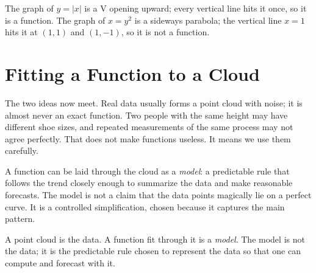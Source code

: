 \documentclass[12pt]{book}
\begin{document}
\begin{center}
\end{center}

\begin{example}
The graph of $y=|x|$ is a V opening upward; every vertical line hits it once, so it
is a function. The graph of $x=y^2$ is a sideways parabola; the vertical line
$x=1$ hits it at $(1,1)$ and $(1,-1)$, so it is not a function.
\end{example}

\section{Fitting a Function to a Cloud}

The two ideas now meet. Real data usually forms a point cloud with noise; it is
almost never an exact function. Two people with the same height may have different
shoe sizes, and repeated measurements of the same process may not agree perfectly.
That does not make functions useless. It means we use them carefully.

A function can be laid through the cloud as a \emph{model}: a predictable rule that
follows the trend closely enough to summarize the data and make reasonable forecasts.
The model is not a claim that the data points magically lie on a perfect curve. It is
a controlled simplification, chosen because it captures the main pattern.
\begin{keyidea}
A point cloud is the data. A function fit through it is a \emph{model}. The model is
not the data; it is the predictable rule chosen to represent the data so that one can
compute and forecast with it.
\end{keyidea}
\end{document}
